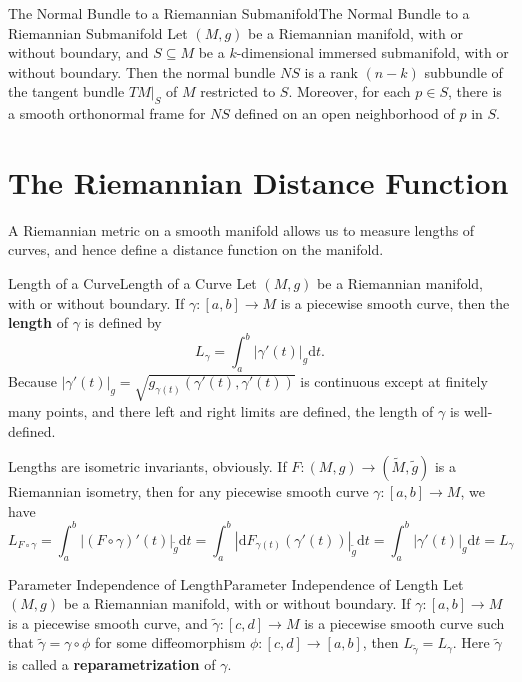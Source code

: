 \documentclass[../main.tex]{subfiles}
\begin{document}
\begin{proposition}{The Normal Bundle to a Riemannian Submanifold}{The Normal Bundle to a Riemannian Submanifold}
  Let $(M,g)$ be a Riemannian manifold, with or without boundary, and $S\subseteq M$ be a $k$-dimensional immersed submanifold, with or without boundary. Then the normal bundle $NS$ is a rank $(n-k)$ subbundle of the tangent bundle $TM|_S$ of $M$ restricted to $S$. Moreover, for each $p\in S$, there is a smooth orthonormal frame for $NS$ defined on an open neighborhood of $p$ in $S$.
\end{proposition}

\section{The Riemannian Distance Function}
A Riemannian metric on a smooth manifold allows us to measure lengths of curves, and hence define a distance function on the manifold.

\begin{definition}{Length of a Curve}{Length of a Curve}
  Let $(M,g)$ be a Riemannian manifold, with or without boundary. If $\gamma:[a,b]\to M$ is a piecewise smooth curve, then the \textbf{length} of $\gamma$ is defined by
  \begin{equation}
    L_\gamma = \int_a^b |\gamma'(t)|_g \mathrm{d} t.
  \end{equation}
  Because $|\gamma'(t)|_g = \sqrt{g_{\gamma(t)}(\gamma'(t), \gamma'(t))}$ is continuous except at finitely many points, and there left and right limits are defined, the length of $\gamma$ is well-defined.
\end{definition}

Lengths are isometric invariants, obviously. If $F:(M,g)\to (\tilde{M}, \tilde{g})$ is a Riemannian isometry, then for any piecewise smooth curve $\gamma:[a,b]\to M$, we have
\begin{equation*}
  L_{F\circ \gamma} = \int_a^b |(F\circ \gamma)'(t)|_{\tilde{g}} \mathrm{d} t = \int_a^b |\mathrm{d} F_{\gamma(t)}(\gamma'(t))|_{\tilde{g}} \mathrm{d} t = \int_a^b |\gamma'(t)|_g \mathrm{d} t = L_\gamma
\end{equation*}

\begin{proposition}{Parameter Independence of Length}{Parameter Independence of Length}
  Let $(M,g)$ be a Riemannian manifold, with or without boundary. If $\gamma:[a,b]\to M$ is a piecewise smooth curve, and $\tilde{\gamma}:[c,d]\to M$ is a piecewise smooth curve such that $\tilde{\gamma} = \gamma \circ \phi$ for some diffeomorphism $\phi:[c,d]\to [a,b]$, then $L_{\tilde{\gamma}} = L_\gamma$. Here $\tilde{\gamma}$ is called a \textbf{reparametrization} of $\gamma$.
\end{proposition}
\end{document}
